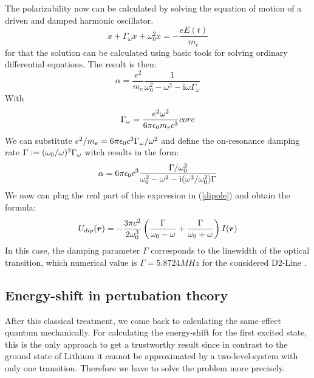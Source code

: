 The polarizability now can be calculated by solving the equation of motion of a driven and damped harmonic oscillator.
\begin{equation}
\ddot x+\Gamma_\omega\dot x+\omega^2_0x=-\frac{eE(t)}{m_e}
\end{equation} 
for that the solution can be calculated using basic tools for solving ordinary differential equations. The result is then:
\begin{equation}
\alpha=\frac{e^2}{m_e}\frac{1}{\omega^2_0-\omega^2-\mathrm{i}\omega\Gamma_\omega}
\end{equation} 
With
\begin{equation}
\Gamma_\omega=\frac{e^2\omega^2}{6\pi\epsilon_0m_ec^3}core
\end{equation}
We can substitute $e^2/m_e=6\pi\epsilon_0c^3\Gamma_\omega/\omega^2$ and define the on-resonance damping rate $\Gamma:=(\omega_0/\omega)^2\Gamma_\omega$ witch results in the form:
\begin{equation}
\alpha=6\pi\epsilon_0c^3\frac{\Gamma/\omega^2_0}{\omega^2_0-\omega^2-\mathrm{i}(\omega^3/\omega^2_0)\Gamma}
\end{equation} 
We now can plug the real part of this expression in (\ref{dipole}) and obtain the formula:
\begin{equation}
U_{dip}(\boldsymbol{r})=-\frac{3\pi c^2}{2\omega^3_0}\left(\frac{\Gamma}{\omega_0-\omega}+\frac{\Gamma}{\omega_0+\omega}\right	)I(\boldsymbol{r})
\label{classic}\end{equation}
In this case, the damping parameter $\Gamma$ corresponds to the linewidth of the optical transition, which numerical value is $\Gamma=5.8724 \unit{MHz}$ for the considered D2-Line \cite{gehm}.

\subsection{Energy-shift in pertubation theory}

After this classical treatment, we come back to calculating the same effect quantum mechanically. For calculating the energy-shift for the first excited state, this is the only approach to get a trustworthy result since in contrast to the ground state of Lithium it cannot be approximated by a two-level-system with only one transition. Therefore we have to solve the problem more precisely. 

